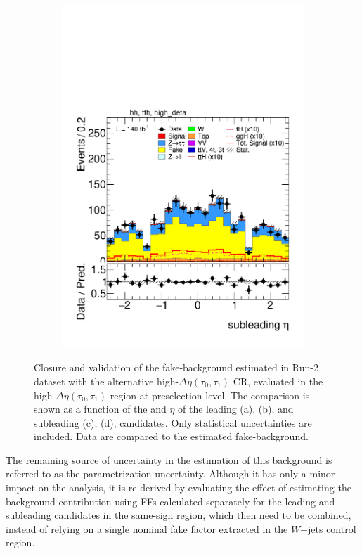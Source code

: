 \begin{figure}[htbp]
\begin{subfigure}[b]{0.45\textwidth}
          \includegraphics[width=\textwidth]{images/using_highdeta_ffs_run2_inclusive/plot_tau_1_eta_hh_tth_15_16_17_18_high_deta.pdf}
          \caption{}
        \end{subfigure}
        \caption{
    Closure and validation of the fake-\tauhad background estimated in Run-2 dataset with the alternative high-$\Delta \eta (\tau_0, \tau_1)$ \tauhadhad CR, evaluated in the high-$\Delta \eta (\tau_0, \tau_1)$ region at preselection level.
    The comparison is shown as a function of the \pt and $\eta$ of the leading (a), (b), and subleading (c), (d), \tauhad candidates. Only statistical uncertainties are included.
    Data are compared to the estimated fake-\tauhad background.
  }
  \label{fig:closure_validation_highdeta_run2}
\end{figure}

The remaining source of uncertainty in the estimation of this background is referred to as the parametrization uncertainty. Although it has only a minor impact on the analysis, it is re-derived by evaluating the effect of estimating the background contribution using FFs calculated separately for the leading and subleading \tauhad candidates in the \tauhadhad same-sign region, which then need to be combined, instead of relying on a single nominal fake factor extracted in the \taulephad $W$+jets control region.  

